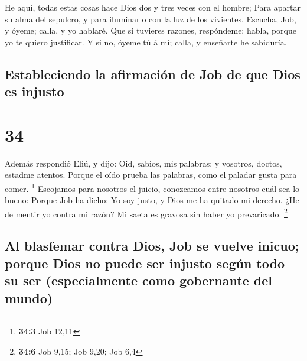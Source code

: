  He aquí, todas estas cosas hace Dios dos y tres veces con
el hombre;  Para apartar su alma del sepulcro, y para
iluminarlo con la luz de los vivientes.  Escucha, Job, y
óyeme; calla, y yo hablaré.  Que si tuvieres razones,
respóndeme: habla, porque yo te quiero justificar.  Y si
no, óyeme tú á mí; calla, y enseñarte he sabiduría.

\hypertarget{estableciendo-la-afirmaciuxf3n-de-job-de-que-dios-es-injusto}{%
\subsection{Estableciendo la afirmación de Job de que Dios es
injusto}\label{estableciendo-la-afirmaciuxf3n-de-job-de-que-dios-es-injusto}}

\hypertarget{section-33}{%
\section{34}\label{section-33}}

 Además respondió Eliú, y dijo:  Oid, sabios,
mis palabras; y vosotros, doctos, estadme atentos.  Porque
el oído prueba las palabras, como el paladar gusta para comer.
\footnote{\textbf{34:3} Job 12,11}  Escojamos para nosotros
el juicio, conozcamos entre nosotros cuál sea lo bueno: 
Porque Job ha dicho: Yo soy justo, y Dios me ha quitado mi derecho.
 ¿He de mentir yo contra mi razón? Mi saeta es gravosa sin
haber yo prevaricado. \footnote{\textbf{34:6} Job 9,15; Job 9,20; Job
  6,4}

\hypertarget{al-blasfemar-contra-dios-job-se-vuelve-inicuo-porque-dios-no-puede-ser-injusto-seguxfan-todo-su-ser-especialmente-como-gobernante-del-mundo}{%
\subsection{Al blasfemar contra Dios, Job se vuelve inicuo; porque Dios
no puede ser injusto según todo su ser (especialmente como gobernante
del
mundo)}\label{al-blasfemar-contra-dios-job-se-vuelve-inicuo-porque-dios-no-puede-ser-injusto-seguxfan-todo-su-ser-especialmente-como-gobernante-del-mundo}}

